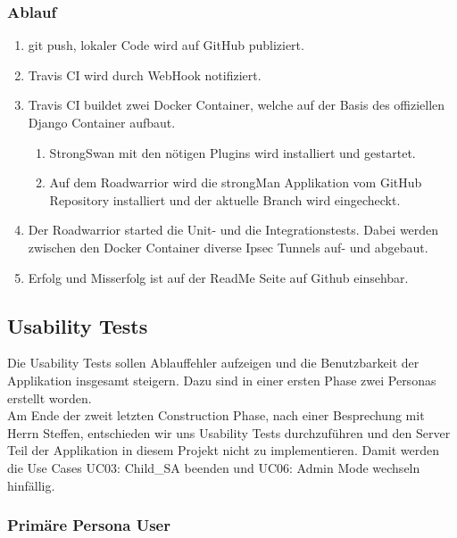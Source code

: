 \subsubsection{Ablauf}
\begin{enumerate}
	\item git push, lokaler Code wird auf GitHub publiziert.
	\item Travis CI wird durch WebHook notifiziert.
	\item Travis CI buildet zwei Docker Container, welche auf der Basis des offiziellen Django Container aufbaut.
	\begin{enumerate}
         \item StrongSwan mit den nötigen Plugins wird installiert und gestartet.
         \item Auf dem Roadwarrior wird die strongMan Applikation vom GitHub Repository installiert und der aktuelle Branch wird eingecheckt.
      \end{enumerate}
      \item Der Roadwarrior started die Unit- und die Integrationstests. Dabei werden zwischen den Docker Container diverse Ipsec Tunnels auf- und abgebaut.
      \item Erfolg und Misserfolg ist auf der ReadMe Seite auf Github einsehbar.
\end{enumerate}

\newpage
\subsection{Usability Tests}

Die Usability Tests sollen Ablauffehler aufzeigen und die Benutzbarkeit der Applikation insgesamt steigern. Dazu sind in einer ersten Phase zwei Personas erstellt worden.
\\
\label{UsabilityEntscheid}
Am Ende der zweit letzten Construction Phase, nach einer Besprechung mit Herrn Steffen, entschieden wir uns Usability Tests durchzuführen und den Server Teil der Applikation in diesem Projekt nicht zu implementieren.
Damit werden die Use Cases UC03: Child\_SA beenden und UC06: Admin Mode wechseln hinfällig.

\subsubsection{Primäre Persona User}





